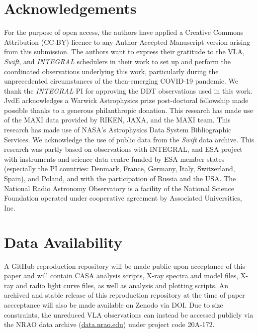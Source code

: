 \documentclass[fleqn,usenatbib]{mnras}
\begin{document}
\section{Acknowledgements}
For the purpose of open access, the authors have applied a Creative Commons Attribution (CC-BY) licence to any Author Accepted Manuscript version arising from this submission. The authors want to express their gratitude to the VLA, \textit{Swift}, and \textit{INTEGRAL} schedulers in their work to set up and perform the coordinated observations underlying this work, particularly during the unprecedented circumstances of the then-emerging COVID-19 pandemic. We thank the \textit{INTEGRAL} PI for approving the DDT observations used in this work. JvdE acknowledges a Warwick Astrophysics prize post-doctoral fellowship made possible thanks to a generous philanthropic donation. This research has made use of the MAXI data provided by RIKEN, JAXA, and the MAXI team. This research has made use of NASA's Astrophysics Data System Bibliographic Services. We acknowledge the use of public data from the \textit{Swift} data archive. This research was partly based on observations with INTEGRAL, and ESA project with instruments and science data centre funded by ESA member states (especially the PI countries: Denmark, France, Germany, Italy, Switzerland, Spain), and Poland, and with the participation of Russia and the USA. The National Radio Astronomy Observatory is a facility of the National Science Foundation operated under cooperative agreement by Associated Universities, Inc.

\section*{Data Availability}
A GitHub reproduction repository will be made public upon acceptance of this paper and will contain CASA analysis scripts, X-ray spectra and model files, X-ray and radio light curve files, as well as analysis and plotting scripts. An archived and stable release of this reproduction repository at the time of paper accceptance will also be made available on Zenodo via DOI. Due to size constraints, the unreduced VLA observations can instead be accessed publicly via the NRAO data archive (\url{data.nrao.edu}) under project code 20A-172. 






\bsp	%
\label{lastpage}
\end{document}
